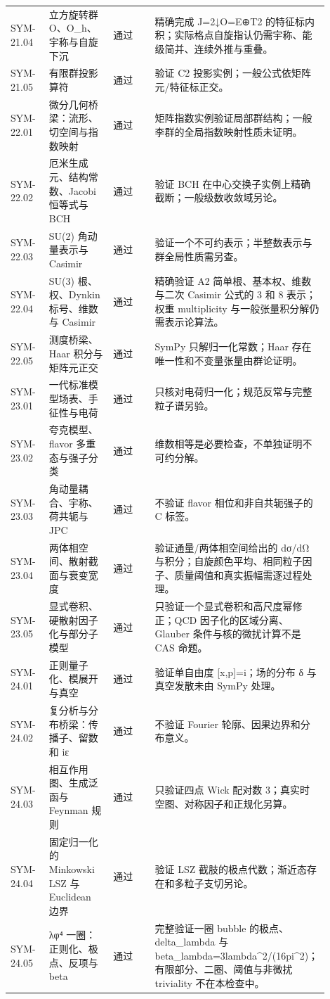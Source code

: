 \begin{longtable}{p{0.12\linewidth}p{0.20\linewidth}p{0.13\linewidth}p{0.45\linewidth}}
SYM-21.04 & 立方旋转群 O、O\_h、宇称与自旋下沉 & 通过 & 精确完成 J=2↓O=E⊕T2 的特征标内积；实际格点自旋指认仍需宇称、能级简并、连续外推与重叠。\\
SYM-21.05 & 有限群投影算符 & 通过 & 验证 C2 投影实例；一般公式依矩阵元/特征标正交。\\
SYM-22.01 & 微分几何桥梁：流形、切空间与指数映射 & 通过 & 矩阵指数实例验证局部群结构；一般李群的全局指数映射性质未证明。\\
SYM-22.02 & 厄米生成元、结构常数、Jacobi 恒等式与 BCH & 通过 & 验证 BCH 在中心交换子实例上精确截断；一般级数收敛域另论。\\
SYM-22.03 & SU(2) 角动量表示与 Casimir & 通过 & 验证一个不可约表示；半整数表示与群全局性质需另查。\\
SYM-22.04 & SU(3) 根、权、Dynkin 标号、维数与 Casimir & 通过 & 精确验证 A2 简单根、基本权、维数与二次 Casimir 公式的 3 和 8 表示；权重 multiplicity 与一般张量积分解仍需表示论算法。\\
SYM-22.05 & 测度桥梁、Haar 积分与矩阵元正交 & 通过 & SymPy 只解归一化常数；Haar 存在唯一性和不变量张量由群论证明。\\
SYM-23.01 & 一代标准模型场表、手征性与电荷 & 通过 & 只核对电荷归一化；规范反常与完整粒子谱另验。\\
SYM-23.02 & 夸克模型、flavor 多重态与强子分类 & 通过 & 维数相等是必要检查，不单独证明不可约分解。\\
SYM-23.03 & 角动量耦合、宇称、荷共轭与 JPC & 通过 & 不验证 flavor 相位和非自共轭强子的 C 标签。\\
SYM-23.04 & 两体相空间、散射截面与衰变宽度 & 通过 & 验证通量/两体相空间给出的 dσ/dΩ 与积分；自旋颜色平均、相同粒子因子、质量阈值和真实振幅需逐过程处理。\\
SYM-23.05 & 显式卷积、硬散射因子化与部分子模型 & 通过 & 只验证一个显式卷积和高尺度幂修正；QCD 因子化的区域分离、Glauber 条件与核的微扰计算不是 CAS 命题。\\
SYM-24.01 & 正则量子化、模展开与真空 & 通过 & 验证单自由度 [x,p]=i；场的分布 δ 与真空发散未由 SymPy 处理。\\
SYM-24.02 & 复分析与分布桥梁：传播子、留数和 iε & 通过 & 不验证 Fourier 轮廓、因果边界和分布意义。\\
SYM-24.03 & 相互作用图、生成泛函与 Feynman 规则 & 通过 & 只验证四点 Wick 配对数 3；真实时空图、对称因子和正规化另算。\\
SYM-24.04 & 固定归一化的 Minkowski LSZ 与 Euclidean 边界 & 通过 & 验证 LSZ 截肢的极点代数；渐近态存在和多粒子支切另论。\\
SYM-24.05 & λφ⁴ 一圈：正则化、极点、反项与 beta & 通过 & 完整验证一圈 bubble 的极点、delta\_lambda 与 beta\_lambda=3lambda^2/(16pi^2)；有限部分、二圈、阈值与非微扰 triviality 不在本检查中。\\

\end{longtable}
